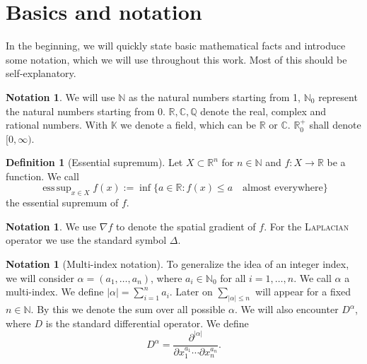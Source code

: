 \documentclass[12pt,a4paper,twoside, open=right]{scrreprt}
\theoremstyle{definition}
\newtheorem{defn}[auf]{Definition}
\newtheorem{notation}[auf]{Notation}
\theoremstyle{plain}
\DeclareMathOperator*{\esssup}{ess\,sup} %
\newcommand{\abs}[1]{\left\vert #1\right\vert}
\newcommand{\rr}{\mathbb{R}}
\newcommand{\cc}{\mathbb{C}}
\newcommand{\kk}{\mathbb{K}}
\newcommand{\nn}{\mathbb{N}}
\newcommand{\qq}{\mathbb{Q}}
\begin{document}
\section{Basics and notation}
In the beginning, we will quickly state basic mathematical facts and introduce some notation, which we will use throughout this work. Most of this should be self-explanatory.
\begin{notation}
    We will use $\nn$ as the natural numbers starting from 1, $\nn_0$ represent the natural numbers starting from 0. $\rr,\cc,\qq$ denote the real, complex and rational numbers. With $\kk$ we denote a field, which can be $\rr$ or $\cc$. $\rr^+_0$ shall denote $[0,\infty)$.
\end{notation} 
\begin{defn}[Essential supremum]
    Let $X\subset\rr^n$ for $n\in\nn$ and $f\colon X\to \rr$ be a function. 
    We call 
    \begin{equation}
        \esssup_{x\in X}f(x):=\inf\{a\in\rr\colon f(x)\le a\quad\text{almost everywhere}\}
    \end{equation}
    the essential supremum of $f$. 
\end{defn}
\begin{notation}
    We use $\nabla f$ to denote the spatial gradient of $f$. For the \textsc{Laplacian} operator we use the standard symbol $\Delta$. 
\end{notation}
\begin{notation}[Multi-index notation]
    To generalize the idea of an integer index, we will consider $\alpha=(a_1,\dotsc,a_n)$, where $a_i\in\nn_0$ for all $i=1,\dotsc,n$. We call $\alpha$ a multi-index. We define $\abs{\alpha}=\sum_{i=1}^na_i$. Later on $\sum_{\abs{\alpha}\le n}$ will appear for a fixed $n\in\nn$. By this we denote the sum over all possible $\alpha$. We will also encounter $D^\alpha$, where $D$ is the standard differential operator. We define \begin{equation}
        D^\alpha=\frac{\partial^{\abs{\alpha}}}{\partial x_1^{a_1}\dotsb\partial x_n^{a_n}}.
    \end{equation}
\end{notation}
\end{document}
